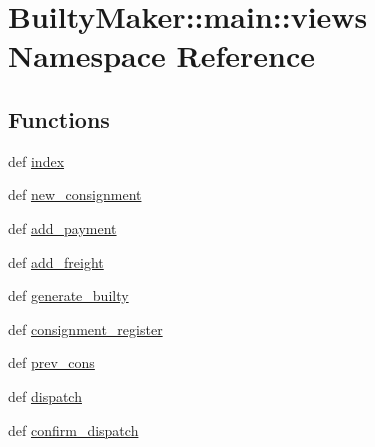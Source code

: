 \hypertarget{namespaceBuiltyMaker_1_1main_1_1views}{\section{\-Builty\-Maker\-:\-:main\-:\-:views \-Namespace \-Reference}
\label{namespaceBuiltyMaker_1_1main_1_1views}
}
\subsection*{\-Functions}
\begin{DoxyCompactItemize}
\item 
def \hyperlink{namespaceBuiltyMaker_1_1main_1_1views_afb72af427644267f72fcf897dce669bd}{index}
\item 
def \hyperlink{namespaceBuiltyMaker_1_1main_1_1views_a009a56b37b7d01110fa7c06344350c3f}{new\-\_\-consignment}
\item 
def \hyperlink{namespaceBuiltyMaker_1_1main_1_1views_a7103ebfbd491f88412558977dd702f34}{add\-\_\-payment}
\item 
def \hyperlink{namespaceBuiltyMaker_1_1main_1_1views_a902788175f52aa306c1d20c244597ca5}{add\-\_\-freight}
\item 
def \hyperlink{namespaceBuiltyMaker_1_1main_1_1views_ae77351e9cc51efdccbe69e1d7f75c84f}{generate\-\_\-builty}
\item 
def \hyperlink{namespaceBuiltyMaker_1_1main_1_1views_a3c63d0bce8cdc85eae460d29d58b35a5}{consignment\-\_\-register}
\item 
def \hyperlink{namespaceBuiltyMaker_1_1main_1_1views_a5412367ed2bb3fbb5162952d636950c9}{prev\-\_\-cons}
\item 
def \hyperlink{namespaceBuiltyMaker_1_1main_1_1views_ada58662a9c88d0572724b65b2a0fcf0a}{dispatch}
\item 
def \hyperlink{namespaceBuiltyMaker_1_1main_1_1views_a3fde372aa61e97f70089a31a1781bc25}{confirm\-\_\-dispatch}
\end{DoxyCompactItemize}


